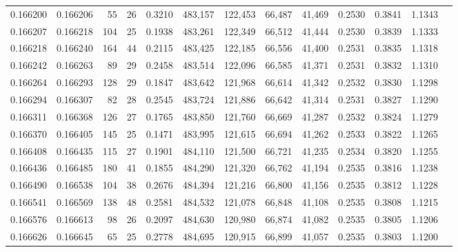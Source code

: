 \begin{tabular}{rrrrrrrrrrrrr}
0.166200 & 0.166206 &    55 &  26 &                                     0.3210 & 483,157 & 122,453 &  66,487 &  41,469 & 0.2530 & 0.3841 & 1.1343 \\
0.166207 & 0.166218 &   104 &  25 &                                     0.1938 & 483,261 & 122,349 &  66,512 &  41,444 & 0.2530 & 0.3839 & 1.1333 \\
0.166218 & 0.166240 &   164 &  44 &                                     0.2115 & 483,425 & 122,185 &  66,556 &  41,400 & 0.2531 & 0.3835 & 1.1318 \\
0.166242 & 0.166263 &    89 &  29 &                                     0.2458 & 483,514 & 122,096 &  66,585 &  41,371 & 0.2531 & 0.3832 & 1.1310 \\
0.166264 & 0.166293 &   128 &  29 &                                     0.1847 & 483,642 & 121,968 &  66,614 &  41,342 & 0.2532 & 0.3830 & 1.1298 \\
0.166294 & 0.166307 &    82 &  28 &                                     0.2545 & 483,724 & 121,886 &  66,642 &  41,314 & 0.2531 & 0.3827 & 1.1290 \\
0.166311 & 0.166368 &   126 &  27 &                                     0.1765 & 483,850 & 121,760 &  66,669 &  41,287 & 0.2532 & 0.3824 & 1.1279 \\
0.166370 & 0.166405 &   145 &  25 &                                     0.1471 & 483,995 & 121,615 &  66,694 &  41,262 & 0.2533 & 0.3822 & 1.1265 \\
0.166408 & 0.166435 &   115 &  27 &                                     0.1901 & 484,110 & 121,500 &  66,721 &  41,235 & 0.2534 & 0.3820 & 1.1255 \\
0.166436 & 0.166485 &   180 &  41 &                                     0.1855 & 484,290 & 121,320 &  66,762 &  41,194 & 0.2535 & 0.3816 & 1.1238 \\
0.166490 & 0.166538 &   104 &  38 &                                     0.2676 & 484,394 & 121,216 &  66,800 &  41,156 & 0.2535 & 0.3812 & 1.1228 \\
0.166541 & 0.166569 &   138 &  48 &                                     0.2581 & 484,532 & 121,078 &  66,848 &  41,108 & 0.2535 & 0.3808 & 1.1215 \\
0.166576 & 0.166613 &    98 &  26 &                                     0.2097 & 484,630 & 120,980 &  66,874 &  41,082 & 0.2535 & 0.3805 & 1.1206 \\
0.166626 & 0.166645 &    65 &  25 &                                     0.2778 & 484,695 & 120,915 &  66,899 &  41,057 & 0.2535 & 0.3803 & 1.1200 \\

\end{tabular}
